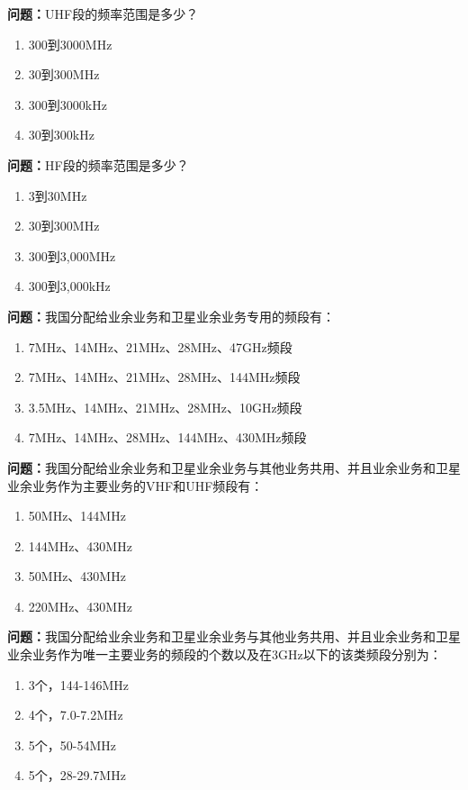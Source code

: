 \documentclass[UTF8]{ctexbook}
\begin{document}
\textbf{问题：}UHF段的频率范围是多少？
\begin{enumerate}[label=\Alph*), leftmargin=3em]
  \item 300到3000MHz
  \item 30到300MHz
  \item 300到3000kHz
  \item 30到300kHz
\end{enumerate}

\textbf{问题：}HF段的频率范围是多少？
\begin{enumerate}[label=\Alph*), leftmargin=3em]
  \item 3到30MHz
  \item 30到300MHz
  \item 300到3,000MHz
  \item 300到3,000kHz
\end{enumerate}

\textbf{问题：}我国分配给业余业务和卫星业余业务专用的频段有：
\begin{enumerate}[label=\Alph*), leftmargin=3em]
  \item 7MHz、14MHz、21MHz、28MHz、47GHz频段
  \item 7MHz、14MHz、21MHz、28MHz、144MHz频段
  \item 3.5MHz、14MHz、21MHz、28MHz、10GHz频段
  \item 7MHz、14MHz、28MHz、144MHz、430MHz频段
\end{enumerate}

\textbf{问题：}我国分配给业余业务和卫星业余业务与其他业务共用、并且业余业务和卫星业余业务作为主要业务的VHF和UHF频段有：
\begin{enumerate}[label=\Alph*), leftmargin=3em]
  \item 50MHz、144MHz
  \item 144MHz、430MHz
  \item 50MHz、430MHz
  \item 220MHz、430MHz
\end{enumerate}

\textbf{问题：}我国分配给业余业务和卫星业余业务与其他业务共用、并且业余业务和卫星业余业务作为唯一主要业务的频段的个数以及在3GHz以下的该类频段分别为：
\begin{enumerate}[label=\Alph*), leftmargin=3em]
  \item 3个，144-146MHz
  \item 4个，7.0-7.2MHz
  \item 5个，50-54MHz
  \item 5个，28-29.7MHz
\end{enumerate}
\end{document}
